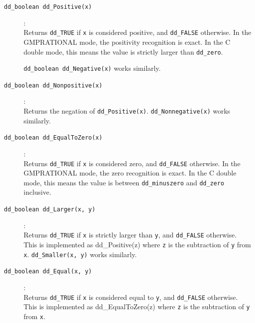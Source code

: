 \documentclass[11pt]{article}
\newcommand {\0} {{\bf 0}}
\begin{document}
\begin{description}

\item[{\tt dd\_boolean dd\_Positive(x)}]:\\
Returns {\tt dd\_TRUE} if {\tt x} is considered positive,  and  {\tt dd\_FALSE} otherwise.
In the GMPRATIONAL mode, the positivity recognition is exact.  In the C double mode,
this means the value is strictly larger than  {\tt dd\_zero}.

{\tt dd\_boolean dd\_Negative(x)} works similarly.

\item[{\tt dd\_boolean dd\_Nonpositive(x)}]:\\
Returns the negation of {\tt dd\_Positive(x)}.   {\tt dd\_Nonnegative(x)} works similarly.

\item[{\tt dd\_boolean dd\_EqualToZero(x)}]:\\
Returns {\tt dd\_TRUE} if {\tt x} is considered zero,  and  {\tt dd\_FALSE} otherwise.
In the GMPRATIONAL mode, the zero recognition is exact.  In the C double mode,
this means the value is between {\tt dd\_minuszero} and  {\tt dd\_zero}
inclusive.

\item[{\tt dd\_boolean dd\_Larger(x, y)}]:\\
Returns {\tt dd\_TRUE} if {\tt x} is strictly larger than {\tt y},  and  {\tt dd\_FALSE} otherwise.
This is implemented as {dd\_Positive(z)} where {\tt z} is the subtraction of {\tt y}
from {\tt x}.
{\tt dd\_Smaller(x, y)} works similarly.

\item[{\tt dd\_boolean dd\_Equal(x, y)}]:\\
Returns {\tt dd\_TRUE} if {\tt x} is considered equal to  {\tt y},  and  {\tt dd\_FALSE} otherwise.
This is implemented as {dd\_EqualToZero(z)} where {\tt z} is the subtraction of {\tt y}
from {\tt x}.
\end{description}
\end{document}
